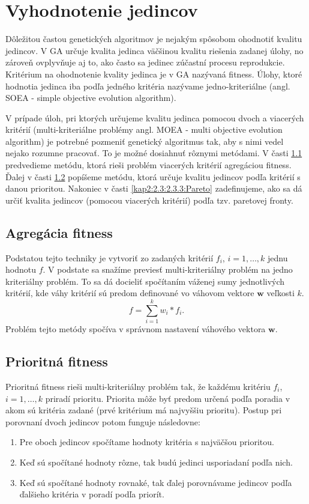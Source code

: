 \section{Vyhodnotenie jedincov}\label{kap2:2.3:Fitnesses}
Dôležitou častou genetických algoritmov je nejakým spôsobom ohodnotiť kvalitu jedincov. V GA určuje kvalita jedinca väčšinou kvalitu riešenia zadanej úlohy, no zároveň ovplyvňuje aj to, ako často sa jedinec zúčastní procesu reprodukcie. Kritérium na ohodnotenie kvality jedinca je v GA nazývaná fitness. Úlohy, ktoré hodnotia jedinca iba podľa jedného kritéria nazývame jedno-kriteriálne (angl. SOEA - simple objective evolution algorithm). 

V prípade úloh, pri ktorých určujeme kvalitu jedinca pomocou dvoch a viacerých kritérií (multi-kriteriálne problémy angl. MOEA - multi objective evolution algorithm) je potrebné pozmeniť genetický algoritmus tak, aby s nimi vedel nejako rozumne pracovať. To je možné dosiahnuť rôznymi metódami.
V časti \ref{kap2:2.3:2.3.1:Weighted} predvedieme metódu, ktorá rieši problém viacerých kritérií agregáciou fitness. Ďalej v časti \ref{kap2:2.3:2.3.2:Priority} popíšeme metódu, ktorá určuje kvalitu jedincov podľa kritérií s danou prioritou. Nakoniec v časti \ref{kap2:2.3:2.3.3:Pareto} zadefinujeme, ako sa dá určiť kvalita jedincov (pomocou viacerých kritérií) podľa tzv. paretovej fronty.

\subsection{Agregácia fitness}\label{kap2:2.3:2.3.1:Weighted}
Podstatou tejto techniky je vytvoriť zo zadaných kritérií $f_{i}$, $i=1,\ldots,k$ jednu hodnotu $f$. V podstate sa snažíme previesť multi-kriteriálny problém na jedno kriteriálny problém. To sa dá docieliť spočítaním váženej sumy jednotlivých kritérií, kde váhy kritérií sú predom definované vo váhovom vektore $\mathbf{w}$ veľkosti $k$.
\begin{equation}
f = \sum_{i=1}^{k} w_{i} * f_{i}. \nonumber
\end{equation}
Problém tejto metódy spočíva v správnom nastavení váhového vektora $\mathbf{w}$.
\subsection{Prioritná fitness}\label{kap2:2.3:2.3.2:Priority}
Prioritná fitness rieši multi-kriteriálny problém tak, že každému kritériu $f_i$, $i = 1,\ldots,k$ priradí prioritu. Priorita môže byť predom určená podľa poradia v akom sú kritéria zadané (prvé kritérium má najvyššiu prioritu). Postup pri porovnaní dvoch jedincov potom funguje následovne:
\begin{enumerate}
\item Pre oboch jedincov spočítame hodnoty kritéria s najväčšou prioritou.
\item Keď sú spočítané hodnoty rôzne, tak budú jedinci usporiadaní podľa nich.
\item Keď sú spočítané hodnoty rovnaké, tak ďalej porovnávame jedincov podľa ďalšieho kritéria v poradí podľa priorít.
\end{enumerate}

